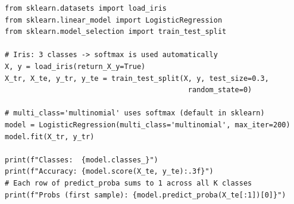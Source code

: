 \begin{lstlisting}[style=pythonstyle]
from sklearn.datasets import load_iris
from sklearn.linear_model import LogisticRegression
from sklearn.model_selection import train_test_split

# Iris: 3 classes -> softmax is used automatically
X, y = load_iris(return_X_y=True)
X_tr, X_te, y_tr, y_te = train_test_split(X, y, test_size=0.3,
                                           random_state=0)

# multi_class='multinomial' uses softmax (default in sklearn)
model = LogisticRegression(multi_class='multinomial', max_iter=200)
model.fit(X_tr, y_tr)

print(f"Classes:  {model.classes_}")
print(f"Accuracy: {model.score(X_te, y_te):.3f}")
# Each row of predict_proba sums to 1 across all K classes
print(f"Probs (first sample): {model.predict_proba(X_te[:1])[0]}")
\end{lstlisting}
